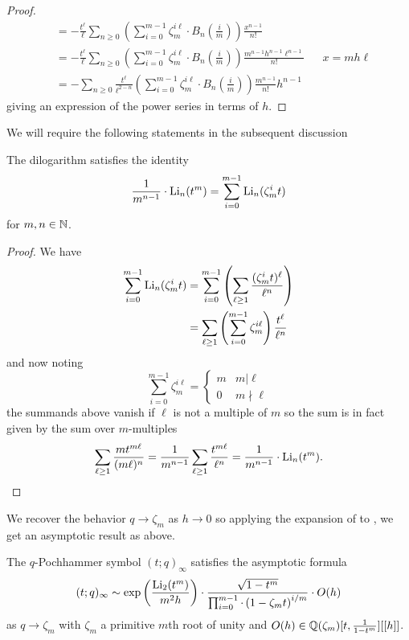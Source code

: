 \begin{proof}
\begin{align*}
        &= -\frac{t^{\ell}}{\ell}\sum_{n\geq0}\left(\sum_{i=0}^{m-1}\zeta_{m}^{i\ell}\cdot B_{n}\left(\frac{i}{m}\right)\right)\frac{x^{n-1}}{n!} \\
        &= -\frac{t^{\ell}}{\ell}\sum_{n\geq0}\left(\sum_{i=0}^{m-1}\zeta_{m}^{i\ell}\cdot B_{n}\left(\frac{i}{m}\right)\right)\frac{m^{n-1}h^{n-1}\ell^{n-1}}{n!} && x=mh\ell\\
        &= -\sum_{n\geq0}\frac{t^{\ell}}{\ell^{2-n}}\left(\sum_{i=0}^{m-1}\zeta_{m}^{i\ell}\cdot B_{n}\left(\frac{i}{m}\right)\right)\frac{m^{n-1}}{n!}h^{n-1}
    \end{align*}
    giving an expression of the power series in terms of $h$. 
\end{proof}
We will require the following statements in the subsequent discussion 
\begin{lemma}\label{lem: dilogarithm roots of unity sum}
    The dilogarithm satisfies the identity 
    \begin{equation}\label{eqn: dilogarithm roots of unity sum}
        \frac{1}{m^{n-1}}\cdot\mathrm{Li}_{n}(t^{m}) = \sum_{i=0}^{m-1}\mathrm{Li}_{n}(\zeta_{m}^{i}t)
    \end{equation}
    for $m,n\in\mathbb{N}$. 
\end{lemma}
\begin{proof}
    We have 
    \begin{align*}
        \sum_{i=0}^{m-1}\mathrm{Li}_{n}(\zeta_{m}^{i}t) &= \sum_{i=0}^{m-1}\left(\sum_{\ell\geq1}\frac{(\zeta_{m}^{i}t)^{\ell}}{\ell^{n}}\right) \\
        &= \sum_{\ell\geq 1}\left(\sum_{i=0}^{m-1}\zeta_{m}^{i\ell}\right)\frac{t^{\ell}}{\ell^{n}}
    \end{align*}  
    and now noting 
    $$\sum_{i=0}^{m-1}\zeta_{m}^{i\ell}=\begin{cases}
        m & m|\ell \\
        0 & m\nmid\ell
    \end{cases}$$
    the summands above vanish if $\ell$ is not a multiple of $m$ so the sum is in fact given by the sum over $m$-multiples
    $$\sum_{\ell\geq1}\frac{mt^{m\ell}}{(m\ell)^{n}}=\frac{1}{m^{n-1}}\sum_{\ell\geq1}\frac{t^{m\ell}}{\ell^{n}}=\frac{1}{m^{n-1}}\cdot\mathrm{Li}_{n}(t^{m}).$$
\end{proof}
We recover the behavior $q\to\zeta_{m}$ as $h\to0$ so applying the expansion of  to , we get an asymptotic result as above. 
\begin{proposition}\label{prop: asymptotics of q t Pochhammer at root of unity}
    The $q$-Pochhammer symbol $(t;q)_{\infty}$ satisfies the asymptotic formula
    \begin{equation}\label{eqn: asymptotics of q t Pochhammer at root of unity}
        (t;q)_{\infty}\sim\exp\left(\frac{\mathrm{Li}_{2}(t^{m})}{m^{2}h}\right)\cdot\frac{\sqrt{1-t^{m}}}{\prod_{i=0}^{m-1}\cdot\left(1-\zeta_{m}t\right)^{i/m}}\cdot O(h)
    \end{equation}
    as $q\to \zeta_{m}$ with $\zeta_{m}$ a primitive $m$th root of unity and $O(h)\in\mathbb{Q}(\zeta_{m})[t,\frac{1}{1-t^{m}}][[h]]$.
\end{proposition}
